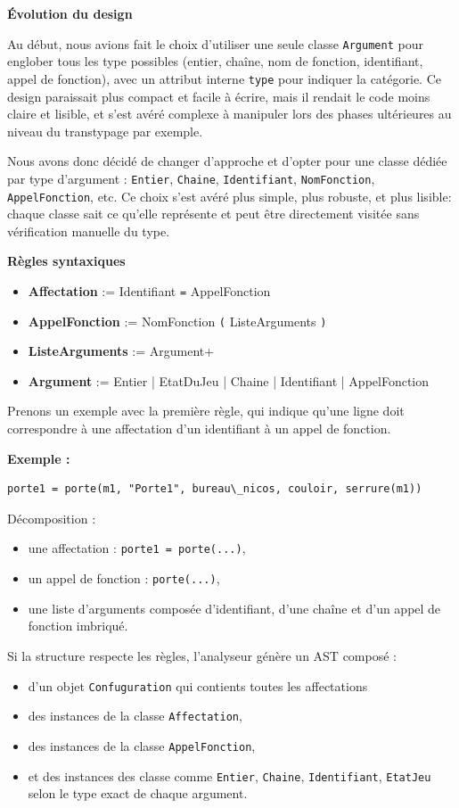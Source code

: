 \textbf{Évolution du design}

Au début, nous avions fait le choix d’utiliser une seule classe \texttt{Argument} pour englober tous les type possibles (entier, chaîne, nom de fonction, identifiant, appel de fonction), avec un attribut interne \texttt{type} pour indiquer la catégorie.  
Ce design paraissait plus compact et facile à écrire, mais il rendait le code moins claire et lisible, et s'est avéré complexe à manipuler lors des phases ultérieures au niveau du transtypage  par exemple.

Nous avons donc décidé de changer d’approche et d’opter pour une classe dédiée par type d’argument :  
\texttt{Entier}, \texttt{Chaine}, \texttt{Identifiant}, \texttt{NomFonction}, \texttt{AppelFonction}, etc.  
Ce choix s’est avéré plus simple, plus robuste, et plus lisible: chaque classe sait ce qu’elle représente et peut être directement visitée sans vérification manuelle du type.

\textbf{Règles syntaxiques}
\begin{itemize}
    \item \textbf{Affectation} := Identifiant \texttt{=} AppelFonction
    \item \textbf{AppelFonction} := NomFonction \texttt{(} ListeArguments \texttt{)}
    \item \textbf{ListeArguments} := Argument+
    \item \textbf{Argument} := Entier | EtatDuJeu | Chaine | Identifiant | AppelFonction
\end{itemize}

Prenons un exemple avec la première règle, qui indique qu'une ligne doit correspondre à une affectation d'un identifiant à un appel de fonction.

\textbf{Exemple :}
\begin{Verbatim}
porte1 = porte(m1, "Porte1", bureau\_nicos, couloir, serrure(m1))
\end{Verbatim}
Décomposition :
\begin{itemize}
    \item une affectation : \texttt{porte1 = porte(...)},
    \item un appel de fonction : \texttt{porte(...)},
    \item une liste d’arguments composée d’identifiant, d’une chaîne et d’un appel de fonction imbriqué.
\end{itemize}

Si la structure respecte les règles, l’analyseur génère un AST composé :
\begin{itemize}
    \item d'un objet \texttt{Confuguration} qui contients toutes les affectations
    \item des instances de la classe \texttt{Affectation},
    \item des instances de la classe \texttt{AppelFonction},
    \item et des instances des classe comme \texttt{Entier}, \texttt{Chaine}, \texttt{Identifiant}, \texttt{EtatJeu} selon le type exact de chaque argument.
\end{itemize}

